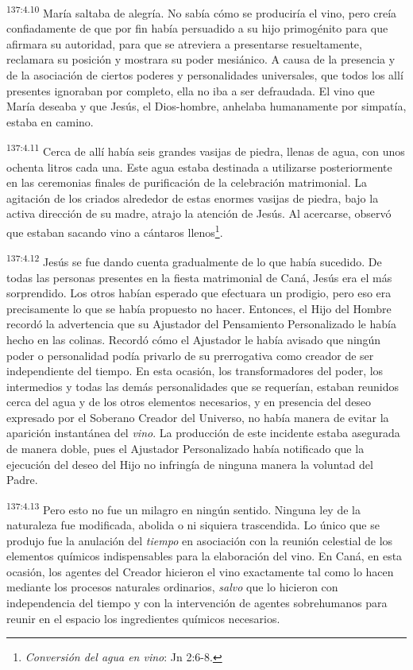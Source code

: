 \par 
\textsuperscript{137:4.10} María saltaba de alegría. No sabía cómo se produciría el vino, pero creía confiadamente de que por fin había persuadido a su hijo primogénito para que afirmara su autoridad, para que se atreviera a presentarse resueltamente, reclamara su posición y mostrara su poder mesiánico. A causa de la presencia y de la asociación de ciertos poderes y personalidades universales, que todos los allí presentes ignoraban por completo, ella no iba a ser defraudada. El vino que María deseaba y que Jesús, el Dios-hombre, anhelaba humanamente por simpatía, estaba en camino.

\par 
\textsuperscript{137:4.11} Cerca de allí había seis grandes vasijas de piedra, llenas de agua, con unos ochenta litros cada una. Este agua estaba destinada a utilizarse posteriormente en las ceremonias finales de purificación de la celebración matrimonial. La agitación de los criados alrededor de estas enormes vasijas de piedra, bajo la activa dirección de su madre, atrajo la atención de Jesús. Al acercarse, observó que estaban sacando vino a cántaros llenos\footnote{\textit{Conversión del agua en vino}: Jn 2:6-8.}.

\par 
\textsuperscript{137:4.12} Jesús se fue dando cuenta gradualmente de lo que había sucedido. De todas las personas presentes en la fiesta matrimonial de Caná, Jesús era el más sorprendido. Los otros habían esperado que efectuara un prodigio, pero eso era precisamente lo que se había propuesto no hacer. Entonces, el Hijo del Hombre recordó la advertencia que su Ajustador del Pensamiento Personalizado le había hecho en las colinas. Recordó cómo el Ajustador le había avisado que ningún poder o personalidad podía privarlo de su prerrogativa como creador de ser independiente del tiempo. En esta ocasión, los transformadores del poder, los intermedios y todas las demás personalidades que se requerían, estaban reunidos cerca del agua y de los otros elementos necesarios, y en presencia del deseo expresado por el Soberano Creador del Universo, no había manera de evitar la aparición instantánea del \textit{vino}. La producción de este incidente estaba asegurada de manera doble, pues el Ajustador Personalizado había notificado que la ejecución del deseo del Hijo no infringía de ninguna manera la voluntad del Padre.

\par 
\textsuperscript{137:4.13} Pero esto no fue un milagro en ningún sentido. Ninguna ley de la naturaleza fue modificada, abolida o ni siquiera trascendida. Lo único que se produjo fue la anulación del \textit{tiempo} en asociación con la reunión celestial de los elementos químicos indispensables para la elaboración del vino. En Caná, en esta ocasión, los agentes del Creador hicieron el vino exactamente tal como lo hacen mediante los procesos naturales ordinarios, \textit{salvo} que lo hicieron con independencia del tiempo y con la intervención de agentes sobrehumanos para reunir en el espacio los ingredientes químicos necesarios.


